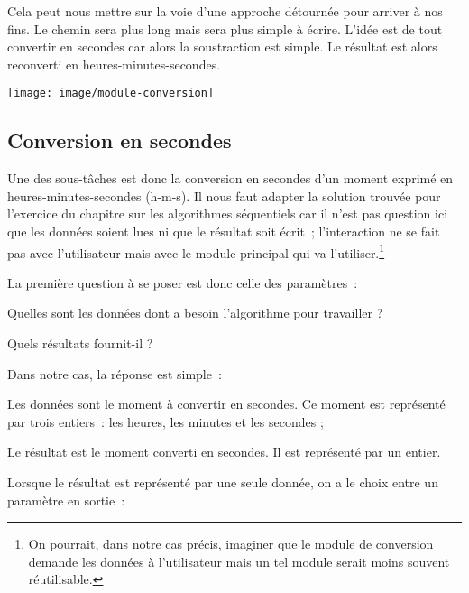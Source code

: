 	Cela peut nous mettre sur la voie d'une approche
	détournée pour arriver à nos fins. Le chemin sera plus long mais sera
	plus simple à écrire. L'idée est de tout convertir en
	secondes car alors la soustraction est simple. Le résultat est alors
	reconverti en heures-minutes-secondes.

	\begin{center}
	\texttt{[image: image/module-conversion]}
	\end{center}

\subsection*{Conversion en secondes}

	Une des sous-tâches est donc la conversion en secondes
	d'un moment exprimé en heures-minutes-secondes
	(h-m-s). Il nous faut adapter la solution trouvée pour
	l'exercice du chapitre sur les algorithmes séquentiels
	car il n'est pas question ici que les données soient
	lues ni que le résultat soit écrit~; l'interaction ne
	se fait pas avec l'utilisateur mais avec le module
	principal qui va l'utiliser.\footnote{On pourrait,
	dans notre cas précis, imaginer que le module de conversion demande les
	données à l'utilisateur mais un tel module serait
	moins souvent réutilisable.}

	La première question à se poser est donc celle des paramètres~:

	\begin{liste}
	\item 
		Quelles sont les données dont a besoin l'algorithme
		pour travailler ?
	\item 
		Quels résultats fournit-il ?
	\end{liste}

	Dans notre cas, la réponse est simple~:

	\begin{liste}
	\item {
		Les données sont le moment à convertir en secondes. Ce moment est
		représenté par trois entiers~: les heures, les minutes et les secondes
		;}
	\item {
		Le résultat est le moment converti en secondes. Il est représenté par un
		entier.}
	\end{liste}

	Lorsque le résultat est représenté par une seule donnée, on a le choix
	entre un paramètre en sortie~:

	
